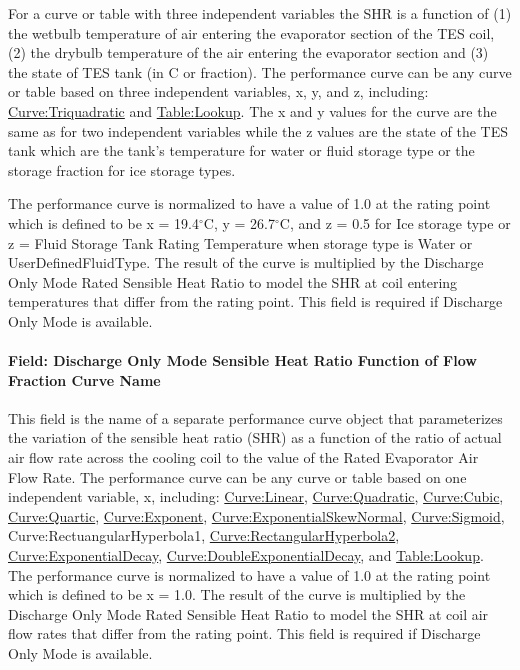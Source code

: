 For a curve or table with three independent variables the SHR is a function of (1) the wetbulb temperature of air entering the evaporator section of the TES coil, (2) the drybulb temperature of the air entering the evaporator section and (3) the state of TES tank (in C or fraction). The performance curve can be any curve or table based on three independent variables, x, y, and z, including: \hyperref[curvetriquadratic]{Curve:Triquadratic} and \hyperref[tablelookup]{Table:Lookup}. The x and y values for the curve are the same as for two independent variables while the z values are the state of the TES tank which are the tank's temperature for water or fluid storage type or the storage fraction for ice storage types.

The performance curve is normalized to have a value of 1.0 at the rating point which is defined to be x = 19.4$^\circ$C, y = 26.7$^\circ$C, and z = 0.5 for Ice storage type or z = Fluid Storage Tank Rating Temperature when storage type is Water or UserDefinedFluidType. The result of the curve is multiplied by the Discharge Only Mode Rated Sensible Heat Ratio to model the SHR at coil entering temperatures that differ from the rating point. This field is required if Discharge Only Mode is available.

\paragraph{Field: Discharge Only Mode Sensible Heat Ratio Function of Flow Fraction Curve Name}\label{field-discharge-only-mode-sensible-heat-ratio-function-of-flow-fraction-curve-name}

This field is the name of a separate performance curve object that parameterizes the variation of the sensible heat ratio (SHR) as a function of the ratio of actual air flow rate across the cooling coil to the value of the Rated Evaporator Air Flow Rate. The performance curve can be any curve or table based on one independent variable, x, including: \hyperref[curvelinear]{Curve:Linear}, \hyperref[curvequadratic]{Curve:Quadratic}, \hyperref[curvecubic]{Curve:Cubic}, \hyperref[curvequartic]{Curve:Quartic}, \hyperref[curveexponent]{Curve:Exponent}, \hyperref[curveexponentialskewnormal]{Curve:ExponentialSkewNormal}, \hyperref[curvesigmoid]{Curve:Sigmoid}, Curve:RectuangularHyperbola1, \hyperref[curverectangularhyperbola2]{Curve:RectangularHyperbola2}, \hyperref[curveexponentialdecay]{Curve:ExponentialDecay}, \hyperref[curvedoubleexponentialdecay]{Curve:DoubleExponentialDecay}, and \hyperref[tablelookup]{Table:Lookup}. The performance curve is normalized to have a value of 1.0 at the rating point which is defined to be x = 1.0. The result of the curve is multiplied by the Discharge Only Mode Rated Sensible Heat Ratio to model the SHR at coil air flow rates that differ from the rating point. This field is required if Discharge Only Mode is available.

